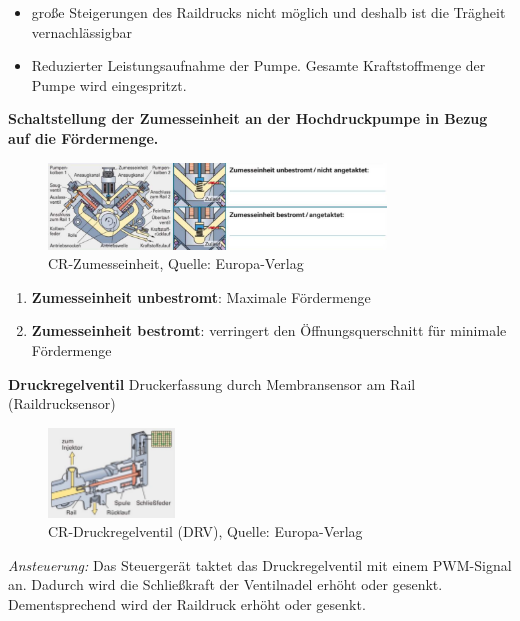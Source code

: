 \begin{enumerate}
\begin{itemize}
    \begin{itemize}
    \item
      große Steigerungen des Raildrucks nicht möglich und deshalb ist
      die Trägheit vernachlässigbar
    \item
      Reduzierter Leistungsaufnahme der Pumpe. Gesamte Kraftstoffmenge
      der Pumpe wird eingespritzt.
    \end{itemize}
  \end{itemize}
\end{enumerate}

\newpage

\textbf{Schaltstellung der Zumesseinheit an der Hochdruckpumpe in Bezug
auf die Fördermenge.}

\begin{figure}[!ht]%
\centering
\includegraphics[width=0.8\textwidth]{images/Diesel/Diesel-3.pdf}
\caption{CR-Zumesseinheit, Quelle: Europa-Verlag}
\end{figure}

\begin{enumerate}
\item
  \textbf{Zumesseinheit unbestromt}: Maximale Fördermenge
\item
  \textbf{Zumesseinheit bestromt}: verringert den Öffnungsquerschnitt
  für minimale Fördermenge
\end{enumerate}

\textbf{Druckregelventil} Druckerfassung durch Membransensor am Rail
(Raildrucksensor)

\begin{figure}[!ht]%
\centering
\includegraphics[width=0.3\textwidth]{images/Diesel/Diesel-8.pdf}
\caption{CR-Druckregelventil (DRV), Quelle: Europa-Verlag}
\end{figure}

\emph{Ansteuerung:} Das Steuergerät taktet das Druckregelventil mit
einem PWM-Signal an. Dadurch wird die Schließkraft der Ventilnadel
erhöht oder gesenkt. Dementsprechend wird der Raildruck erhöht oder
gesenkt.

